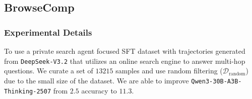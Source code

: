 \subsection{BrowseComp}
\subsubsection{Experimental Details}
To use a private search agent focused SFT dataset with trajectories generated from \texttt{DeepSeek-V3.2} that utilizes an online search engine to answer multi-hop questions. We curate a set of $13215$ samples and use random filtering ($\mathcal{D}_{\text{random}}$) due to the small size of the dataset. We are able to improve \texttt{Qwen3-30B-A3B-Thinking-2507} from $2.5$ accuracy to $11.3$.